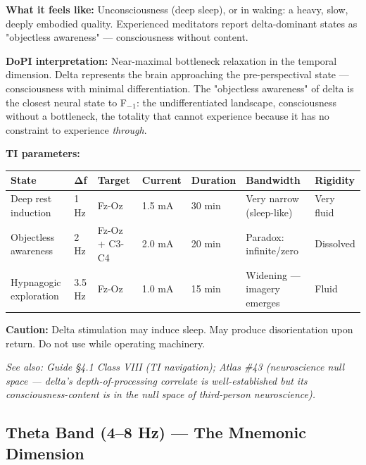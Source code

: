 \textbf{What it feels like:} Unconsciousness (deep sleep), or in waking: a heavy, slow, deeply embodied quality. Experienced meditators report delta-dominant states as "objectless awareness" — consciousness without content.


\textbf{DoPI interpretation:} Near-maximal bottleneck relaxation in the temporal dimension. Delta represents the brain approaching the pre-perspectival state — consciousness with minimal differentiation. The "objectless awareness" of delta is the closest neural state to F$_{-}$$_1$: the undifferentiated landscape, consciousness without a bottleneck, the totality that cannot experience because it has no constraint to experience \textit{through}.


\textbf{TI parameters:}



\begin{longtable}{p{} p{} p{} p{} p{} p{} p{}}
\toprule
\textbf{State} & \textbf{Δf} & \textbf{Target} & \textbf{Current} & \textbf{Duration} & \textbf{Bandwidth} & \textbf{Rigidity} \\
\midrule
\endhead
Deep rest induction & 1 Hz & Fz-Oz & 1.5 mA & 30 min & Very narrow (sleep-like) & Very fluid \\
Objectless awareness & 2 Hz & Fz-Oz + C3-C4 & 2.0 mA & 20 min & Paradox: infinite/zero & Dissolved \\
Hypnagogic exploration & 3.5 Hz & Fz-Oz & 1.0 mA & 15 min & Widening — imagery emerges & Fluid \\
\bottomrule
\end{longtable}



\textbf{Caution:} Delta stimulation may induce sleep. May produce disorientation upon return. Do not use while operating machinery.


\textit{See also: Guide §4.1 Class VIII (TI navigation); Atlas \#43 (neuroscience null space — delta's depth-of-processing correlate is well-established but its consciousness-content is in the null space of third-person neuroscience).}


\bigskip\noindent\makebox[\textwidth]{\color{rulegray}\rule{5cm}{0.3pt}}\bigskip


\subsection*{Theta Band (4–8 Hz) — The Mnemonic Dimension}


